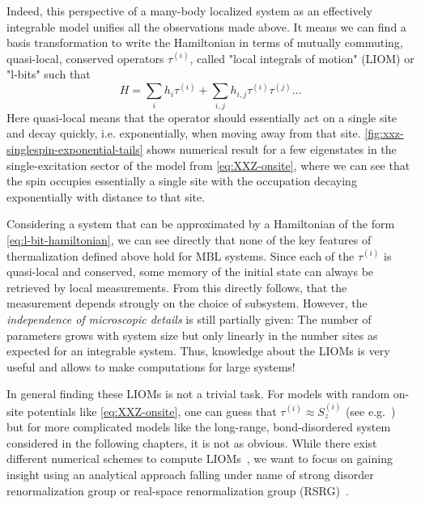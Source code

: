 Indeed, this perspective of a many-body localized system as an effectively integrable model unifies all the observations made above. It means we can find a basis transformation to write the Hamiltonian in terms of mutually commuting, quasi-local, conserved operators $\tau^{(i)}$, called "local integrals of motion" (LIOM) or "l-bits" such that~\cite{serbynLocalConservationLaws2013,swingleSimpleModelManybody2013,husePhenomenologyFullyManybodylocalized2014}
\begin{equation}\label{eq:l-bit-hamiltonian}
	H = \sum_i h_i \tau^{(i)} + \sum_{i,j} h_{i,j} \tau^{(i)}\tau^{(j)} \ldots
\end{equation}
Here quasi-local means that the operator should essentially act on a single site and decay quickly, i.e. exponentially, when moving away from that site. \autoref{fig:xxz-singlespin-exponential-tails} shows numerical result for a few eigenstates in the single-excitation sector of the model from \autoref{eq:XXZ-onsite}, where we can see that the spin occupies essentially a single site with the occupation decaying exponentially with distance to that site. 

Considering a system that can be approximated by a Hamiltonian of the form \autoref{eq:l-bit-hamiltonian}, we can see directly that none of the key features of thermalization defined above hold for MBL systems. Since each of the $\tau^{(i)}$ is quasi-local and conserved, some memory of the initial state can always be retrieved by local measurements. From this directly follows, that the measurement depends strongly on the choice of subsystem. However, the \emph{independence of microscopic details} is still partially given: The number of parameters grows with system size but only linearly in the number sites as expected for an integrable system. Thus, knowledge about the LIOMs is very useful and allows to make computations for large systems!

In general finding these LIOMs is not a trivial task. For models with random on-site potentials like \autoref{eq:XXZ-onsite}, one can guess that $\tau^{(i)}\approx S_z^{(i)}$ (see e.g.~\cite{adamiStructuralPropertiesLocal2022}) but for more complicated models like the long-range, bond-disordered system considered in the following chapters, it is not as obvious. While there exist different numerical schemes to compute LIOMs~\cite{chandranConstructingLocalIntegrals2015,mierzejewskiIdentifyingLocalQuasilocal2015,mierzejewskiApproximateConservationLaws2015,thomsonLocalIntegralsMotion2021,adamiStructuralPropertiesLocal2022}, we want to focus on gaining insight using an analytical approach falling under name of strong disorder renormalization group or real-space renormalization group (RSRG)~\cite{dasguptaLowtemperaturePropertiesRandom1980,fisherRandomTransverseField1992,fisherRandomAntiferromagneticQuantum1994,igloiStrongDisorderRG2005,voskManybodyLocalizationOne2013,voskTheoryManyBodyLocalization2015,parameswaranEigenstatePhaseTransitions2017,monthusStrongDisorderRenormalization2018,igloiStrongDisorderRG2018}.

